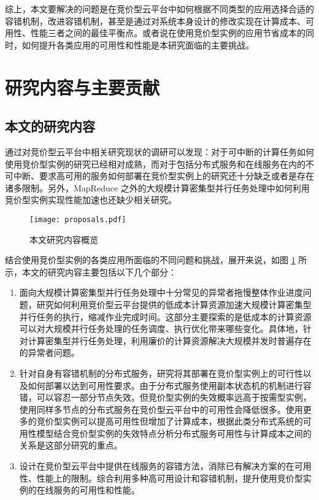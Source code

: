 综上，本文要解决的问题是在竞价型云平台中如何根据不同类型的应用选择合适的容错机制，改进容错机制，甚至是通过对系统本身设计的修改实现在计算成本、可用性、性能三者之间的最佳平衡点。或者说在使用竞价型实例的应用节省成本的同时，如何提升各类应用的可用性和性能是本研究面临的主要挑战。

\section{研究内容与主要贡献}
\subsection{本文的研究内容}
通过对竞价型云平台中相关研究现状的调研可以发现：对于可中断的计算任务如何使用竞价型实例的研究已经相对成熟，而对于包括分布式服务和在线服务在内的不可中断、要求高可用的服务如何部署在竞价型实例上的研究还十分缺乏或者是存在诸多限制。另外，MapReduce 之外的大规模计算密集型并行任务处理中如何利用竞价型实例实现性能加速也还缺少相关研究。
\begin{figure}
  \centering
  \texttt{[image: proposals.pdf]}
  \caption{本文研究内容概览}
  \label{figure:research_proposals}
\end{figure}

结合使用竞价型实例的各类应用所面临的不同问题和挑战，展开来说，如图 \ref{figure:research_proposals} 所示，本文的研究内容主要包括以下几个部分：
\begin{enumerate}
\item 面向大规模计算密集型并行任务处理中十分常见的异常者拖慢整体作业进度问题，研究如何利用竞价型云平台提供的低成本计算资源加速大规模计算密集型并行任务的执行，缩减作业完成时间。这部分主要探索的是低成本的计算资源可以对大规模并行任务处理的任务调度、执行优化带来哪些变化。具体地，针对计算密集型并行任务处理，利用廉价的计算资源解决大规模并发时普遍存在的异常者问题。
\item 针对自身有容错机制的分布式服务，研究将其部署在竞价型实例上的可行性以及如何部署以达到可用性要求。由于分布式服务使用副本状态机的机制进行容错，可以容忍一部分节点失效。但竞价型实例的失效概率远高于按需型实例，使用同样多节点的分布式服务在竞价型云平台中的可用性会降低很多。使用更多的竞价型实例可以提高可用性但增加了计算成本，根据此类分布式系统的可用性模型结合竞价型实例的失效特点分析分布式服务可用性与计算成本之间的关系是这部分研究的重点。
\item 设计在竞价型云平台中提供在线服务的容错方法，消除已有解决方案的在可用性、性能上的限制。综合利用多种高可用设计和容错机制，提升使用竞价型实例的在线服务的可用性和性能。
\end{enumerate}

